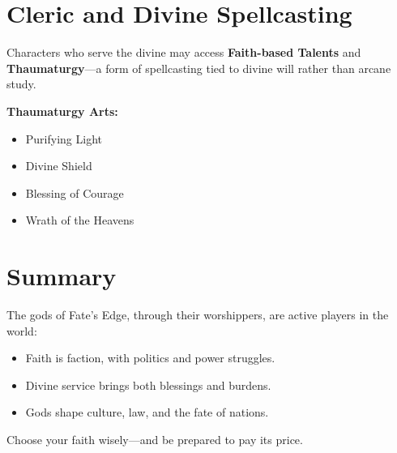 \section{Cleric and Divine Spellcasting}

Characters who serve the divine may access \textbf{Faith-based Talents} and \textbf{Thaumaturgy}—a form of spellcasting tied to divine will rather than arcane study.

\textbf{Thaumaturgy Arts:}
\begin{itemize}
  \item Purifying Light
  \item Divine Shield
  \item Blessing of Courage
  \item Wrath of the Heavens
\end{itemize}

\section{Summary}

The gods of Fate’s Edge, through their worshippers, are active players in the world:

\begin{itemize}
  \item Faith is faction, with politics and power struggles.
  \item Divine service brings both blessings and burdens.
  \item Gods shape culture, law, and the fate of nations.
\end{itemize}

Choose your faith wisely—and be prepared to pay its price.

